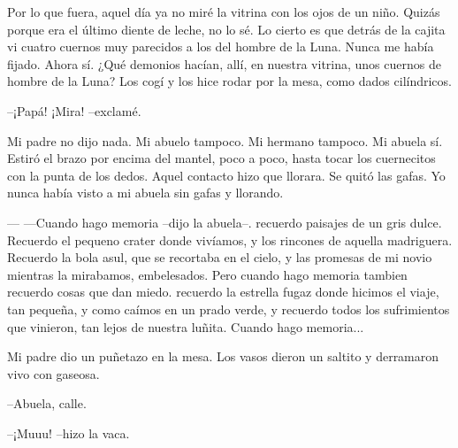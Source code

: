 \documentclass[a4paper]{tufte-handout}
\begin{document}
Por lo que fuera, aquel día ya no miré la vitrina con los ojos de un niño. Quizás porque era el último diente de leche, no lo sé. Lo cierto es que detrás de la cajita vi cuatro cuernos muy parecidos a los del hombre de la Luna. Nunca me había fijado. Ahora sí. ¿Qué demonios hacían, allí, en nuestra vitrina, unos cuernos de hombre de la Luna? Los cogí y los hice rodar por la mesa, como dados cilíndricos.

--¡Papá! ¡Mira! --exclamé.

Mi padre no dijo nada. Mi abuelo tampoco. Mi hermano tampoco. Mi abuela sí. Estiró el brazo por encima del mantel, poco a poco, hasta tocar los cuernecitos con la punta de los dedos. Aquel contacto hizo que llorara. Se quitó las gafas. Yo nunca había visto a mi abuela sin gafas y llorando.

--- ---Cuando hago memoria --dijo la abuela--. recuerdo paisajes de un gris dulce. Recuerdo el pequeno crater donde vivíamos, y los rincones de aquella madriguera. Recuerdo la bola asul, que se recortaba en el cielo, y las promesas de mi novio mientras la mirabamos, embelesados. Pero cuando hago memoria tambien recuerdo cosas que dan miedo. recuerdo la estrella fugaz donde hicimos el viaje, tan pequeña, y como caímos en un prado verde, y recuerdo todos los sufrimientos que vinieron, tan lejos de nuestra luñita. Cuando hago memoria...

Mi padre dio un puñetazo en la mesa. Los vasos dieron un saltito y derramaron vivo con gaseosa.

--Abuela, calle.

--¡Muuu! --hizo la vaca.



\nocite{Albert}


\end{document}

